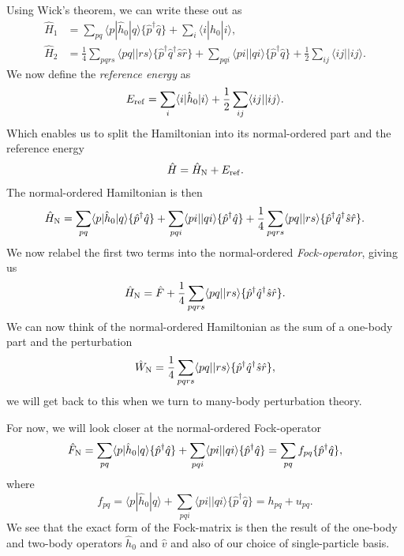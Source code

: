\documentclass[a4paper, 11pt, notitlepage, english]{article}
\newcommand{\brakket}[2]{\langle #1 || #2 \rangle}
\newcommand{\op}[1]{\hat{#1}}
\newcommand{\braopket}[3]{\langle #1 | {#2} | #3 \rangle}
\begin{document}
Using Wick's theorem, we can write these out as 
\begin{align*}
\op{H}_1 &= \sum_{pq}\braopket{p}{\op{h}_0}{q}\{\op{p}^\dag \op{q}\} + \sum_{i}\braopket{i}{\op{h}_0}{i}, \\
\op{H}_2 &= \frac{1}{4}\sum_{pqrs} \brakket{pq}{rs} \{\op{p}^\dag \op{q}^\dag \op{s}\op{r}\} + \sum_{pqi} \brakket{pi}{qi} \{ \op{p}^\dag \op{q} \} + \frac{1}{2}\sum_{ij} \brakket{ij}{ij}.
\end{align*}
We now define the \emph{reference energy} as
$$E_{\rm ref} = \sum_{i}\braopket{i}{\op{h}_0}{i} + \frac{1}{2}\sum_{ij} \brakket{ij}{ij}.$$
Which enables us to split the Hamiltonian into its normal-ordered part and the reference energy
$$\op{H} = \op{H}_{\rm N} + E_{\rm ref}.$$
The normal-ordered Hamiltonian is then
$$\op{H}_{\rm N} = \sum_{pq}\braopket{p}{\op{h}_0}{q}\{\op{p}^\dag \op{q}\}  + \sum_{pqi} \brakket{pi}{qi}\{\op{p}^\dag \op{q}\}  + \frac{1}{4}\sum_{pqrs} \brakket{pq}{rs} \{\op{p}^\dag \op{q}^\dag \op{s}\op{r}\}.$$
We now relabel the first two terms into the normal-ordered \emph{Fock-operator}, giving us
$$\op{H}_{\rm N} = \op{F} + \frac{1}{4}\sum_{pqrs} \brakket{pq}{rs} \{\op{p}^\dag \op{q}^\dag \op{s}\op{r}\}.$$
We can now think of the normal-ordered Hamiltonian as the sum of a one-body part and the perturbation
$$\op{W}_{\rm N}  =\frac{1}{4}\sum_{pqrs} \brakket{pq}{rs} \{\op{p}^\dag \op{q}^\dag \op{s}\op{r}\},$$
we will get back to this when we turn to many-body perturbation theory.

\clearpage

For now, we will look closer at the normal-ordered Fock-operator
$$\op{F}_{\rm N} = \sum_{pq}\braopket{p}{\op{h}_0}{q}\{\op{p}^\dag \op{q}\}  + \sum_{pqi} \brakket{pi}{qi} \{\op{p}^\dag \op{q}\} = \sum_{pq} f_{pq} \{\op{p}^\dagger \op{q} \},$$
where
$$f_{pq} = \braopket{p}{\op{h}_0}{q} + \sum_{pqi} \brakket{pi}{qi} \{\op{p}^\dag \op{q}\} = h_{pq} + u_{pq}.$$
We see that the exact form of the Fock-matrix is then the result of the one-body and two-body operators $\op{h}_0$ and $\op{v}$ and also of our choice of single-particle basis. 
\end{document}
